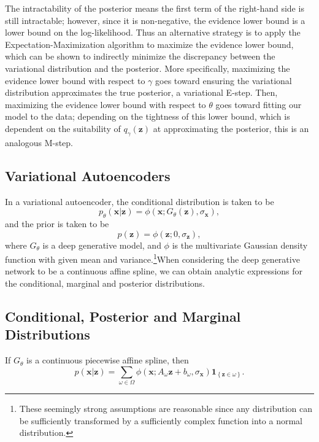 The intractability of the posterior means the first term of the right-hand side is still intractable; however, since it is non-negative, the evidence lower bound is a lower bound on the log-likelihood. Thus an alternative strategy is to apply the Expectation-Maximization algorithm to maximize the evidence lower bound, which can be shown to indirectly minimize the discrepancy between the variational distribution and the posterior. More specifically, maximizing the evidence lower bound with respect to $\gamma$ goes toward ensuring the variational distribution approximates the true posterior, a variational E-step. Then, maximizing the evidence lower bound with respect to $\theta$ goes toward fitting our model to the data; depending on the tightness of this lower bound, which is dependent on the suitability of $q_{\gamma}(\mathbf{z})$ at approximating the posterior, this is an analogous M-step.  

\subsection{Variational Autoencoders}

In a variational autoencoder, the conditional distribution is taken to be $$p_{\theta}(\mathbf{x}\vert\mathbf{z})=\phi\left(\mathbf{x};G_{\theta}(\mathbf{z}),\sigma_{\mathbf{x}}\right),$$and the prior is taken to be $$p(\mathbf{z})=\phi\left(\mathbf{z};0,\sigma_{\mathbf{z}}\right),$$where $G_{\theta}$ is a deep generative model, and $\phi$ is the multivariate Gaussian density function with given mean and variance.\footnote{These seemingly strong assumptions are reasonable since any distribution can be sufficiently transformed by a sufficiently complex function into a normal distribution.}When considering the deep generative network to be a continuous affine spline, we can obtain analytic expressions for the conditional, marginal and posterior distributions.

\subsection{Conditional, Posterior and Marginal Distributions}

\begin{lemma}
    If $G_{\theta}$ is a continuous piecewise affine spline, then $$p(\mathbf{x}\vert\mathbf{z})=\sum_{\omega\in\Omega}\phi\left(\mathbf{x};A_{\omega}\mathbf{z}+b_{\omega},\sigma_{\mathbf{x}}\right)\mathbf{1}_{\left\{\mathbf{z}\in\omega\right\}}.$$
\end{lemma}

